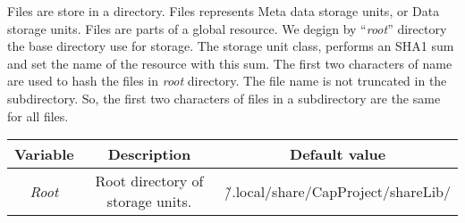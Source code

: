 Files are store in a directory.
Files represents Meta data storage units, or Data storage units.
Files are parts of a global resource.
We degign by “\emph{root}” directory the base directory use for storage.
The storage unit class, performs an SHA1 sum and set the name of the resource with this sum.
The first two characters of name are used to hash the files in \emph{root} directory.
The file name is not truncated in the subdirectory.
So, the first two characters of files in a subdirectory are the same for all files.

\begin{tabular}{|c|c|c|}
 \hline
 {Variable} & {Description} & {Default value} \\
 \hline
 \emph{Root} & Root directory of storage units. & \~/.local/share/CapProject/shareLib/ \\
 \hline
\end{tabular}
